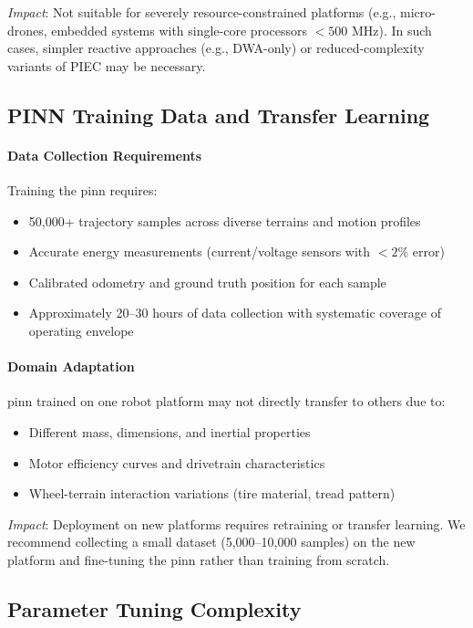 \textit{Impact}: Not suitable for severely resource-constrained platforms (e.g., micro-drones, embedded systems with single-core processors $< 500$ MHz). In such cases, simpler reactive approaches (e.g., DWA-only) or reduced-complexity variants of PIEC may be necessary.

\subsection{PINN Training Data and Transfer Learning}

\paragraph{Data Collection Requirements}
Training the \acrshort{pinn} requires:
\begin{itemize}
    \item 50,000+ trajectory samples across diverse terrains and motion profiles
    \item Accurate energy measurements (current/voltage sensors with $< 2$\% error)
    \item Calibrated odometry and ground truth position for each sample
    \item Approximately 20--30 hours of data collection with systematic coverage of operating envelope
\end{itemize}

\paragraph{Domain Adaptation}
\acrshort{pinn} trained on one robot platform may not directly transfer to others due to:
\begin{itemize}
    \item Different mass, dimensions, and inertial properties
    \item Motor efficiency curves and drivetrain characteristics
    \item Wheel-terrain interaction variations (tire material, tread pattern)
\end{itemize}

\textit{Impact}: Deployment on new platforms requires retraining or transfer learning. We recommend collecting a small dataset (5,000--10,000 samples) on the new platform and fine-tuning the \acrshort{pinn} rather than training from scratch.

\subsection{Parameter Tuning Complexity}


